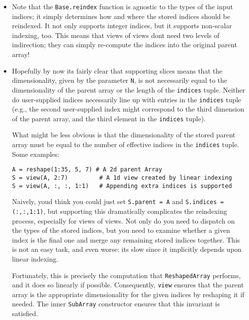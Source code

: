 \begin{itemize}
\item Note that the \texttt{Base.reindex} function is agnostic to the types of the input indices; it simply determines how and where the stored indices should be reindexed. It not only supports integer indices, but it supports non-scalar indexing, too. This means that views of views don{\textquotesingle}t need two levels of indirection; they can simply re-compute the indices into the original parent array!


\item Hopefully by now it{\textquotesingle}s fairly clear that supporting slices means that the dimensionality, given by the parameter \texttt{N}, is not necessarily equal to the dimensionality of the parent array or the length of the \texttt{indices} tuple.  Neither do user-supplied indices necessarily line up with entries in the \texttt{indices} tuple (e.g., the second user-supplied index might correspond to the third dimension of the parent array, and the third element in the \texttt{indices} tuple).

What might be less obvious is that the dimensionality of the stored parent array must be equal to the number of effective indices in the \texttt{indices} tuple. Some examples:


\begin{verbatim}
A = reshape(1:35, 5, 7) # A 2d parent Array
S = view(A, 2:7)         # A 1d view created by linear indexing
S = view(A, :, :, 1:1)   # Appending extra indices is supported
\end{verbatim}

Naively, you{\textquotesingle}d think you could just set \texttt{S.parent = A} and \texttt{S.indices = (:,:,1:1)}, but supporting this dramatically complicates the reindexing process, especially for views of views. Not only do you need to dispatch on the types of the stored indices, but you need to examine whether a given index is the final one and {\textquotedbl}merge{\textquotedbl} any remaining stored indices together. This is not an easy task, and even worse: it{\textquotesingle}s slow since it implicitly depends upon linear indexing.

Fortunately, this is precisely the computation that \texttt{ReshapedArray} performs, and it does so linearly if possible. Consequently, \texttt{view} ensures that the parent array is the appropriate dimensionality for the given indices by reshaping it if needed. The inner \texttt{SubArray} constructor ensures that this invariant is satisfied.



\end{itemize}
